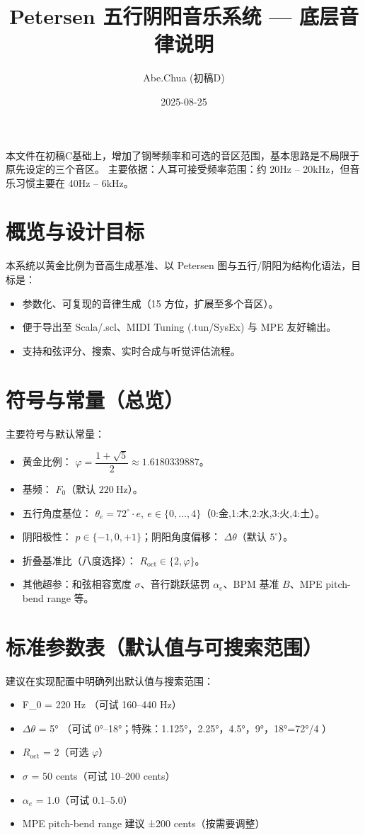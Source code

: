 \documentclass{article}
\title{Petersen 五行阴阳音乐系统 — 底层音律说明}
\author{Abe.Chua (初稿D)}
\date{2025-08-25}
\begin{document}
\maketitle

本文件在初稿C基础上，增加了钢琴频率和可选的音区范围，基本思路是不局限于原先设定的三个音区。
主要依据：人耳可接受频率范围：约 20Hz – 20kHz，但音乐习惯主要在 40Hz – 6kHz。

\section{概览与设计目标}
本系统以黄金比例为音高生成基准、以 Petersen 图与五行/阴阳为结构化语法，目标是：
\begin{itemize}
  \item 参数化、可复现的音律生成（15 方位，扩展至多个音区）。
  \item 便于导出至 Scala/.scl、MIDI Tuning (.tun/SysEx) 与 MPE 友好输出。
  \item 支持和弦评分、搜索、实时合成与听觉评估流程。
\end{itemize}

\section{符号与常量（总览）}
主要符号与默认常量：
\begin{itemize}
  \item 黄金比例： $\varphi=\dfrac{1+\sqrt{5}}{2}\approx1.6180339887$。
  \item 基频： $F_0$（默认 $220\ \mathrm{Hz}$）。
  \item 五行角度基位： $\theta_e=72^\circ\cdot e,\ e\in\{0,\dots,4\}$（0:金,1:木,2:水,3:火,4:土）。
  \item 阴阳极性： $p\in\{-1,0,+1\}$；阴阳角度偏移： $\Delta\theta$（默认 $5^\circ$）。
  \item 折叠基准比（八度选择）： $R_{\mathrm{oct}}\in\{2,\varphi\}$。
  \item 其他超参：和弦相容宽度 $\sigma$、音行跳跃惩罚 $\alpha_e$、BPM 基准 $B$、MPE pitch-bend range 等。
\end{itemize}

\section{标准参数表（默认值与可搜索范围）}
建议在实现配置中明确列出默认值与搜索范围：
\begin{itemize}
  \item F\_0 = 220 Hz （可试 160–440 Hz）
  \item $\Delta\theta$ = 5° （可试 0°–18°；特殊：1.125°，2.25°，4.5°，9°，18°=72°/4 ）
  \item $R_{\mathrm{oct}}$ = 2（可选 $\varphi$）
  \item $\sigma$ = 50 cents（可试 10–200 cents）
  \item $\alpha_e$ = 1.0（可试 0.1–5.0）
  \item MPE pitch-bend range 建议 ±200 cents（按需要调整）
\end{itemize}
\end{document}
